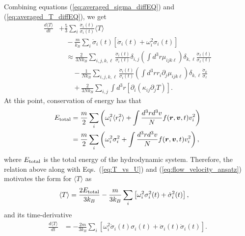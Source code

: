 \documentclass[reprint, amsmath, amssymb, aps, superscriptaddress]{revtex4-1}
\begin{document}
Combining equations (\ref{eq:averaged_sigma_diffEQ}) and (\ref{eq:averaged_T_diffEQ}), we get
\begin{align} \label{eq:averaged_Tsigma_diffEQ}
    \frac{ d \langle T \rangle }{ d t }
    &+ 
    \frac{ 5 }{ 3 } 
    \sum_i 
    \frac{ \dot{\sigma}_i(t) }{ \sigma_i(t) }
    \langle T \rangle \nonumber\\
    &\quad -
    \frac{ m }{ k_B }
    \sum_i
    \dot{\sigma}_i(t)
    \left[
    \ddot{\sigma}_i(t)
    +
    \omega_i^2 \sigma_i(t) 
    \right] \nonumber\\
    &\quad \approx 
    \frac{ 2 }{ 3 N k_B }
    \sum_{i, j, k, \ell} 
    \frac{ \dot{\sigma}_i(t) }{ \sigma_i(t) }
    \delta_{ i, j }
    \left( \int d^3 r \mu_{i j k \ell} \right)
    \delta_{ k, \ell }
    \frac{ \dot{\sigma}_{\ell}(t) }{ \sigma_{\ell}(t) } 
    \nonumber\\ 
    &\quad\quad -
    \frac{ 1 }{ N k_B }
    \sum_{i, j, k, \ell} 
    \frac{ \dot{\sigma}_i(t) }{ \sigma_i(t) }
    \left( \int d^3 r r_i \partial_j \mu_{i j k \ell} \right)
    \delta_{k, \ell} 
    \frac{ \dot{\sigma}_k }{ \sigma_{\ell} } \nonumber\\
    &\quad\quad +
    \frac{ 2 }{ 3 N k_B }
    \sum_{i, j}
    \int d^3 r \left[ \partial_i ( \kappa_{i j} \partial_j T ) \right].
\end{align}
At this point, conservation of energy has that 
\begin{align}
    E_{\rm total}
    &=
    \frac{ m }{ 2 }
    \sum_i 
    \left(
    \omega_i^2 \langle r_i^2 \rangle
    +
    \int \frac{ d^3 r d^3 v }{ N } 
    f(\boldsymbol{r}, \boldsymbol{v}, t) v_i^2
    \right) \nonumber\\
    &=
    \frac{ m }{ 2 }
    \sum_i 
    \left(
    \omega_i^2 \sigma_i^2
    + 
    \int \frac{ d^3 r d^3 v }{ N } 
    f(\boldsymbol{r}, \boldsymbol{v}, t) v_i^2
    \right),
\end{align}
where $E_{\rm total}$ is the total energy of the hydrodynamic system. Therefore, the relation above along with Eqs.~(\ref{eq:T_vs_U}) and (\ref{eq:flow_velocity_ansatz}) motivates the form for $\langle T \rangle$ as
\begin{align} \label{eq:average_temperature_ansatz}
    \langle T \rangle  
    &=
    \frac{ 2 E_{\rm total} }{ 3 k_B }
    -
    \frac{ m }{ 3 k_B }
    \sum_i 
    \left[
    \omega_i^2 \sigma_i^2(t) 
    +
    \dot{\sigma}_i^2(t)
    \right],
\end{align}
and its time-derivative 
\begin{align}
    \frac{ d \langle T \rangle }{ d t }
    &=
    -\frac{ 2 m }{ 3 k_B }
    \sum_i 
    \left[
    \omega_i^2 \dot{\sigma}_i(t) \sigma_i(t) 
    +
    \ddot{\sigma}_i(t) \dot{\sigma}_i(t)
    \right]. 
\end{align} 
\end{document}
